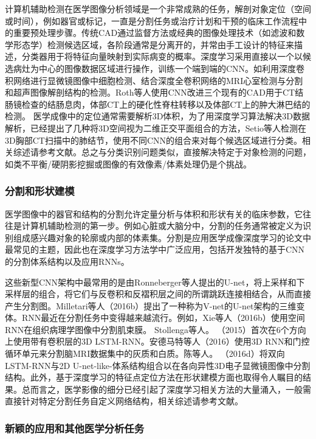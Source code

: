 {计算机辅助检测在医学图像分析领域是一个非常成熟的任务，解剖对象定位（空间或时间），例如器官或标记，一直是分割任务或治疗计划和干预的临床工作流程中的重要预处理步骤。传统CAD\cite{Van2011Computer}通过监督方法或经典的图像处理技术（如滤波和数学形态学）检测候选区域，各阶段通常是分离开的，并常由手工设计的特征来描述，分类器用于将特征向量映射到实际病变的概率。深度学习采用直接以一个以候选病灶为中心的图像数据区域进行操作，训练一个端到端的CNN。如利用深度卷积网络进行显微镜图像中细胞检测\citep{Akram2016}、结合深度全卷积网络的MRI心室检测与分割\citep{Emad2015,Tran2016a}和超声图像解剖结构的检测\citep{Chen2016i}。Roth等人\cite{Roth2016}使用CNN改进三个现有的CAD用于CT结肠镜检查的结肠息肉，体部CT上的硬化性脊柱转移以及体部CT上的肿大淋巴结的检测。
医学成像中的定位通常需要解析3D体积，为了用深度学习算法解决3D数据解析，已经提出了几种将3D空间视为二维正交平面组合的方法，Setio等人\cite{Setio2016Pulmonary}检测在3D胸部CT扫描中的肺结节，使用不同CNN的组合来对每个候选区域进行分类。相关综述请参考文献\cite{Shin2016}。总之与分类识别问题类似，直接解决特定于对象检测的问题，如类不平衡/硬阴影挖掘或图像的有效像素/体素处理仍是个挑战。

\subsubsection{分割和形状建模}

医学图像中的器官和结构的分割允许定量分析与体积和形状有关的临床参数，它往往是计算机辅助检测的第一步。例如心脏或大脑分中，分割的任务通常被定义为识别组成感兴趣对象的轮廓或内部的体素集。分割是应用医学成像深度学习的论文中最常见的主题，因此也在深度学习方法学中广泛应用，包括开发独特的基于CNN的分割体系结构以及应用RNNs。 

这些新型CNN架构中最常用的是由Ronneberger等人\cite{Ronneberger2015}提出的U-net，将上采样和下采样层的组合，将它们与反卷积和反褶积层之间的所谓跳跃连接相结合，从而直接产生分割图。Milletari等人（2016b）提出了一种称为V-net的U-net架构的三维变体。RNN最近在分割任务中变得越来越流行。例如，Xie等人（2016b）使用空间RNN在组织病理学图像中分割肌束膜。 Stollenga等人。 （2015）首次在6个方向上使用带有卷积层的3D LSTM-RNN。安德马特等人（2016）使用3D RNN和门控循环单元来分割脑MRI数据集中的灰质和白质。陈等人。 （2016d）将双向LSTM-RNN与2D U-net-like-体系结构组合以在各向异性3D电子显微镜图像中分割结构。此外，基于深度学习的特征点定位方法\citep{Trigeorgis2016}在形状建模方面也取得令人瞩目的结果。总而言之，医学影像的细分已经引起了深度学习相关方法的大量涌入，一般需直接针对特定分割任务自定义网络结构，相关综述请参考文献\citepns{}。

\subsubsection{新颖的应用和其他医学分析任务}

}
